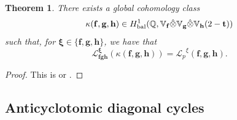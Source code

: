 \documentclass[a4paper,11pt]{amsart}
\theoremstyle{plain}
\newtheorem{theorem}{Theorem}[section]
\theoremstyle{definition}
\theoremstyle{remark}
\DeclareMathOperator{\bal}{bal}
\newcommand{\Lp}{{\mathscr{L}_p}}
\newcommand{\hf}{{\mathbf{f}}}
\newcommand{\hg}{{\mathbf{g}}}
\newcommand{\hh}{{\mathbf h}}
\newcommand{\res}{\mathrm{res}}
\numberwithin{equation}{section}
\begin{document}
\begin{theorem}\label{thm:reclawdiagonalcycles}
There exists a global cohomology class
\[
\kappa(\hf,\hg,\hh) \in H^1_{\bal}(\mathbb Q, \mathbb V_{\hf} \hat \otimes \mathbb V_{\hg} \hat \otimes \mathbb V_{\hh}(2-{\bf t}))
\]
such that, for $\bm{\xi}\in \lbrace \hf,\hg,\hh\rbrace$,
we have that
\[
\mathcal L_{\hf\hg\hh}^{\bm{\xi}}(\kappa(\hf, \hg, \hh)) = \Lp^{\xi}(\hf, \hg, \hh).
\]

\end{theorem}

\begin{proof}
This is \cite[Theorem~A]{BSV} or \cite[Theorem~5.1]{DR3}.

\end{proof}



\subsection{Anticyclotomic diagonal cycles}\label{subsec:ac-cycles}
\end{document}
